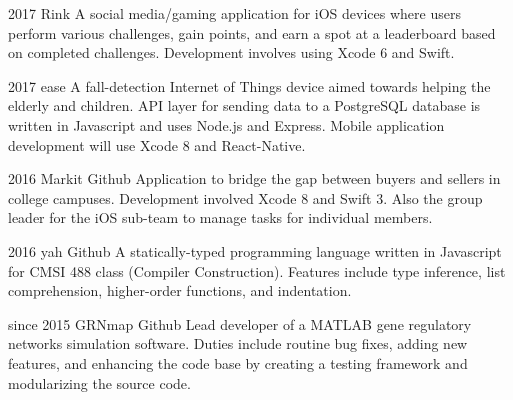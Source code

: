 \documentclass[]{friggeri-cv} %
\begin{document}
  \begin{entrylist}
  
    \entry
      {2017}
      {Rink}
      {}
      {A social media/gaming application for iOS devices where users perform various challenges, gain points, and earn a spot at a leaderboard based on completed challenges. Development involves using Xcode 6 and Swift. }


    \entry
      {2017}
      {ease}
      {}
      {A fall-detection Internet of Things device aimed towards helping the elderly and children. API layer for sending data to a PostgreSQL database is written in Javascript and uses Node.js and Express. Mobile application development will use Xcode 8 and React-Native.}


    \entry
      {2016}
      {Markit}
      {Github}
      {Application to bridge the gap between buyers and sellers in college campuses. Development involved Xcode 8 and Swift 3. Also the group leader for the iOS sub-team to manage tasks for individual members.}

    
    \entry
      {2016}
      {yah}
      {Github}
      {A statically-typed programming language written in Javascript for CMSI 488 class (Compiler Construction). Features include type inference, list comprehension, higher-order functions, and indentation.}


    \entry
      {since 2015}
      {GRNmap}
      {Github}
      {Lead developer of a MATLAB gene regulatory networks simulation software. Duties include routine bug fixes, adding new features, and enhancing the code base by creating a testing framework and modularizing the source code.}



  
  \end{entrylist}
\end{document}
